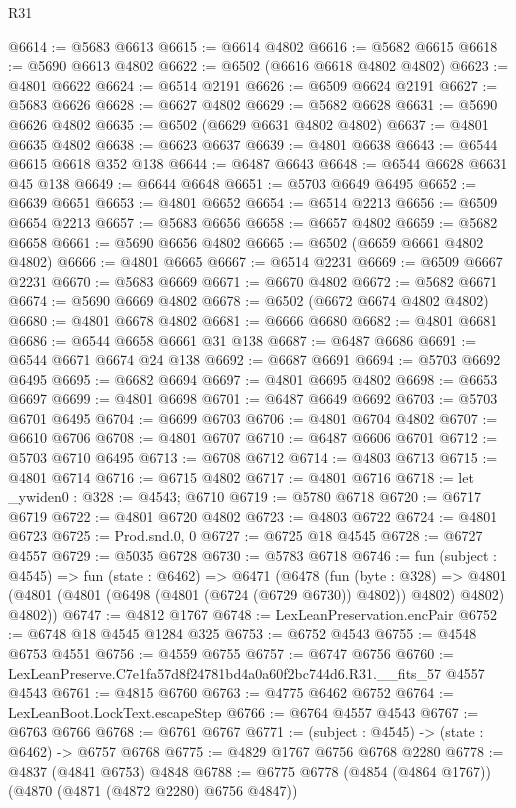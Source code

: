 \begin{lexlean}{R31}
\begin{coremodule}
@6614 := @5683 @6613
@6615 := @6614 @4802
@6616 := @5682 @6615
@6618 := @5690 @6613 @4802
@6622 := @6502 (@6616 @6618 @4802 @4802)
@6623 := @4801 @6622
@6624 := @6514 @2191
@6626 := @6509 @6624 @2191
@6627 := @5683 @6626
@6628 := @6627 @4802
@6629 := @5682 @6628
@6631 := @5690 @6626 @4802
@6635 := @6502 (@6629 @6631 @4802 @4802)
@6637 := @4801 @6635 @4802
@6638 := @6623 @6637
@6639 := @4801 @6638
@6643 := @6544 @6615 @6618 @352 @138
@6644 := @6487 @6643
@6648 := @6544 @6628 @6631 @45 @138
@6649 := @6644 @6648
@6651 := @5703 @6649 @6495
@6652 := @6639 @6651
@6653 := @4801 @6652
@6654 := @6514 @2213
@6656 := @6509 @6654 @2213
@6657 := @5683 @6656
@6658 := @6657 @4802
@6659 := @5682 @6658
@6661 := @5690 @6656 @4802
@6665 := @6502 (@6659 @6661 @4802 @4802)
@6666 := @4801 @6665
@6667 := @6514 @2231
@6669 := @6509 @6667 @2231
@6670 := @5683 @6669
@6671 := @6670 @4802
@6672 := @5682 @6671
@6674 := @5690 @6669 @4802
@6678 := @6502 (@6672 @6674 @4802 @4802)
@6680 := @4801 @6678 @4802
@6681 := @6666 @6680
@6682 := @4801 @6681
@6686 := @6544 @6658 @6661 @31 @138
@6687 := @6487 @6686
@6691 := @6544 @6671 @6674 @24 @138
@6692 := @6687 @6691
@6694 := @5703 @6692 @6495
@6695 := @6682 @6694
@6697 := @4801 @6695 @4802
@6698 := @6653 @6697
@6699 := @4801 @6698
@6701 := @6487 @6649 @6692
@6703 := @5703 @6701 @6495
@6704 := @6699 @6703
@6706 := @4801 @6704 @4802
@6707 := @6610 @6706
@6708 := @4801 @6707
@6710 := @6487 @6606 @6701
@6712 := @5703 @6710 @6495
@6713 := @6708 @6712
@6714 := @4803 @6713
@6715 := @4801 @6714
@6716 := @6715 @4802
@6717 := @4801 @6716
@6718 := let _ywiden0 : @328 := @4543; @6710
@6719 := @5780 @6718
@6720 := @6717 @6719
@6722 := @4801 @6720 @4802
@6723 := @4803 @6722
@6724 := @4801 @6723
@6725 := Prod.snd.{0, 0}
@6727 := @6725 @18 @4545
@6728 := @6727 @4557
@6729 := @5035 @6728
@6730 := @5783 @6718
@6746 := fun (subject : @4545) =>
  fun (state : @6462) =>
  @6471
    (@6478
      (fun (byte : @328) =>
      @4801 (@4801 (@4801 (@6498 (@4801 (@6724 (@6729 @6730)) @4802)) @4802) @4802) @4802))
@6747 := @4812 @1767
@6748 := LexLeanPreservation.encPair
@6752 := @6748 @18 @4545 @1284 @325
@6753 := @6752 @4543
@6755 := @4548 @6753 @4551
@6756 := @4559 @6755
@6757 := @6747 @6756
@6760 := LexLeanPreserve.C7e1fa57d8f24781bd4a0a60f2bc744d6.R31.__fits_57 @4557 @4543
@6761 := @4815 @6760
@6763 := @4775 @6462 @6752
@6764 := LexLeanBoot.LockText.escapeStep
@6766 := @6764 @4557 @4543
@6767 := @6763 @6766
@6768 := @6761 @6767
@6771 := (subject : @4545) -> (state : @6462) -> @6757 @6768
@6775 := @4829 @1767 @6756 @6768 @2280
@6778 := @4837 (@4841 @6753) @4848
@6788 := @6775 @6778 (@4854 (@4864 @1767)) (@4870 (@4871 (@4872 @2280) @6756 @4847))

\end{coremodule}
\end{lexlean}
